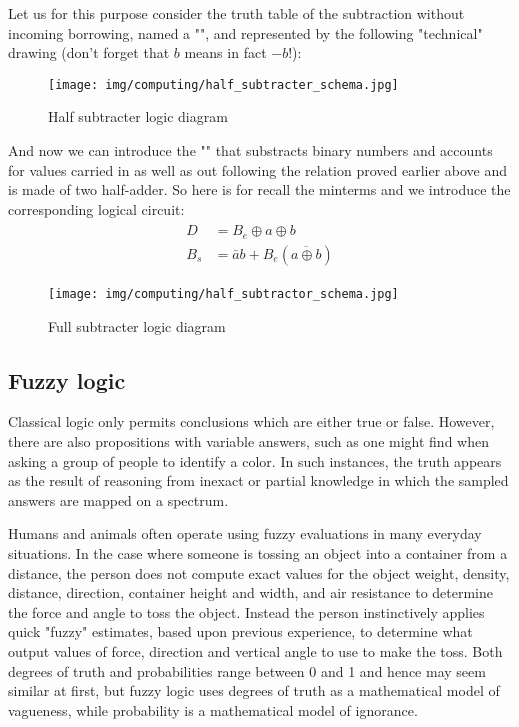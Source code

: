	Let us for this purpose consider the truth table of the subtraction without incoming borrowing, named a "", and represented by the following "technical" drawing (don't forget that $b$ means in fact $-b$!):
	\begin{figure}[H]
		\centering
		\texttt{[image: img/computing/half\_subtracter\_schema.jpg]}
		\caption{Half subtracter logic diagram}
	\end{figure}
	
	And now we can introduce the "" that substracts binary numbers and accounts for values carried in as well as out following the relation proved earlier above and is made of two half-adder. So here is for recall the minterms and we introduce the corresponding logical circuit:
	\begin{gather*}
		\begin{aligned}
		D&=B_e\oplus a\oplus b\\
		B_s&=\bar{a}b+B_e(\overline{a\oplus b})
		\end{aligned}
	\end{gather*}
	\begin{figure}[H]
		\centering
		\texttt{[image: img/computing/half\_subtractor\_schema.jpg]}
		\caption{Full subtracter logic diagram}
	\end{figure}
	
	
	\pagebreak
	\subsection{Fuzzy logic}
	Classical logic only permits conclusions which are either true or false. However, there are also propositions with variable answers, such as one might find when asking a group of people to identify a color. In such instances, the truth appears as the result of reasoning from inexact or partial knowledge in which the sampled answers are mapped on a spectrum.
	
	Humans and animals often operate using fuzzy evaluations in many everyday situations. In the case where someone is tossing an object into a container from a distance, the person does not compute exact values for the object weight, density, distance, direction, container height and width, and air resistance to determine the force and angle to toss the object. Instead the person instinctively applies quick "fuzzy" estimates, based upon previous experience, to determine what output values of force, direction and vertical angle to use to make the toss.
Both degrees of truth and probabilities range between 0 and 1 and hence may seem similar at first, but fuzzy logic uses degrees of truth as a mathematical model of vagueness, while probability is a mathematical model of ignorance.

